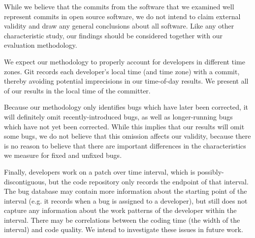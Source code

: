 While we believe that the commits from the software that we examined
well represent commits in open source software, we do not intend to
claim external validity and draw any general conclusions about all
software.  Like any other characteristic study, our findings should be
considered together with our evaluation methodology.

We expect our methodology to properly account for developers in
different time zones. Git records each developer's local time (and
time zone) with a commit, thereby avoiding potential imprecisions in
our time-of-day results. We present all of our results in the local
time of the committer.

Because our methodology only identifies bugs which have later been
corrected, it will definitely omit recently-introduced bugs, as well
as longer-running bugs which have not yet been corrected. While this
implies that our results will omit some bugs, we do not believe that
this omission affects our validity, because there is no reason to
believe that there are important differences in the characteristics we
measure for fixed and unfixed bugs.

Finally, developers work on a patch over time interval, which is
possibly-discontiguous, but the code repository only records the
endpoint of that interval. The bug database may contain more
information about the starting point of the interval (e.g. it records
when a bug is assigned to a developer), but still does not capture any
information about the work patterns of the developer within the
interval. There may be correlations between the coding time (the width
of the interval) and code quality. We intend to investigate these
issues in future work.
